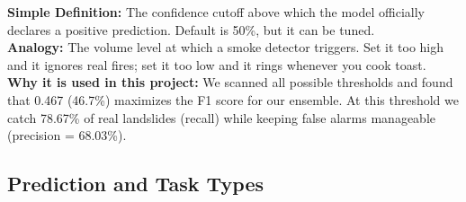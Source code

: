 \documentclass[11pt]{article}
\begin{document}
\begin{description}[style=nextline, leftmargin=1.5cm]
    \item[\textbf{Threshold}]
    \textbf{Simple Definition:} The confidence cutoff above which the model officially declares a positive prediction. Default is 50\%, but it can be tuned.\\
    \textbf{Analogy:} The volume level at which a smoke detector triggers. Set it too high and it ignores real fires; set it too low and it rings whenever you cook toast.\\
    \textbf{Why it is used in this project:} We scanned all possible thresholds and found that 0.467 (46.7\%) maximizes the F1 score for our ensemble. At this threshold we catch 78.67\% of real landslides (recall) while keeping false alarms manageable (precision = 68.03\%).

\end{description}

\subsection{Prediction and Task Types}
\end{document}
